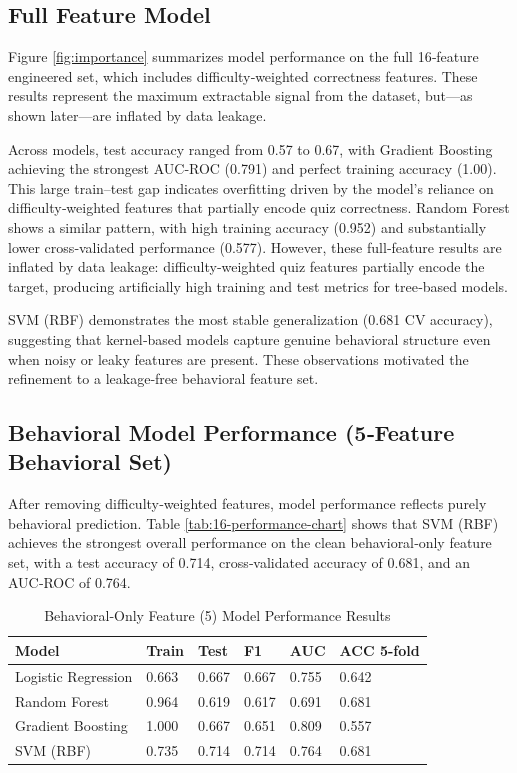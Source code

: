 \documentclass[conference]{IEEEtran}
\begin{document}
\subsection{ Full Feature Model}
Figure \ref{fig:importance} summarizes model performance on the full
16‑feature engineered set, which includes difficulty‑weighted correctness
features. These results represent the maximum extractable signal from the
dataset, but—as shown later—are inflated by data leakage.

Across models, test accuracy ranged from 0.57 to 0.67, with Gradient
Boosting achieving the strongest AUC‑ROC (0.791) and perfect training
accuracy (1.00). This large train–test gap indicates overfitting driven by
the model’s reliance on difficulty‑weighted features that partially encode
quiz correctness. 
Random Forest shows a similar pattern, with high training
accuracy (0.952) and substantially lower cross‑validated performance
(0.577).
However, these full‑feature results are inflated by data leakage: difficulty‑weighted quiz features partially encode the target, producing artificially high training and test metrics for tree‑based models. 

SVM (RBF) demonstrates the most stable generalization (0.681 CV accuracy),
suggesting that kernel‑based models capture genuine behavioral structure
even when noisy or leaky features are present. These observations motivated
the refinement to a leakage‑free behavioral feature set.

\subsection{Behavioral Model Performance (5‑Feature Behavioral Set)}

After removing difficulty‑weighted features, model performance reflects
purely behavioral prediction. Table \ref{tab:16-performance-chart} shows that
SVM (RBF) achieves the strongest overall performance on the clean
behavioral‑only feature set, with a test accuracy of 0.714, cross‑validated accuracy of 0.681, and an AUC‑ROC of 0.764.


\begin{table}[H]
\centering
\caption{Behavioral‑Only Feature (5) Model Performance Results}
\begin{tabular}{|p{2.2cm}|p{.8cm}|p{.8cm}|p{.8cm}|p{.8cm}|p{1.1cm}|}
\hline
\textbf{Model} & \textbf{Train} & \textbf{Test} & \textbf{F1} & \textbf{AUC} & \textbf{ACC 5-fold}\\
\hline
Logistic Regression  & 0.663 & 0.667  & 0.667  & 0.755 & 0.642 \\
\hline
Random Forest & 0.964 & 0.619  & 0.617 & 0.691 &  0.681 \\
\hline
Gradient Boosting & 1.000 & 0.667  & 0.651 & 0.809 &  0.557 \\
\hline
SVM (RBF) & 0.735 & 0.714  & 0.714 & 0.764 &  0.681 \\
\hline
\end{tabular}
\label{tab:performance-chart}
\end{table}
\end{document}
